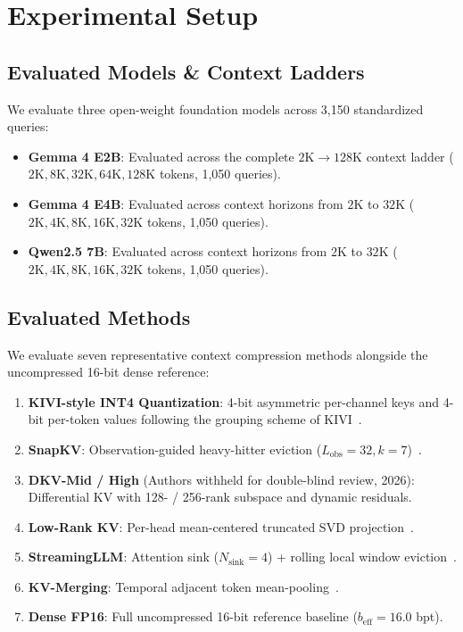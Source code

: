 \documentclass[10pt]{article}
\theoremstyle{definition}
\begin{document}
\section{Experimental Setup}
\label{sec:setup}

\subsection{Evaluated Models \& Context Ladders}
We evaluate three open-weight foundation models across 3,150 standardized queries:
\begin{itemize}[leftmargin=*,itemsep=1.0pt]
    \item \textbf{Gemma 4 E2B}: Evaluated across the complete $2\text{K} \to 128\text{K}$ context ladder ($2\text{K}, 8\text{K}, 32\text{K}, 64\text{K}, 128\text{K}$ tokens, 1,050 queries).
    \item \textbf{Gemma 4 E4B}: Evaluated across context horizons from $2\text{K}$ to $32\text{K}$ ($2\text{K}, 4\text{K}, 8\text{K}, 16\text{K}, 32\text{K}$ tokens, 1,050 queries).
    \item \textbf{Qwen2.5 7B}: Evaluated across context horizons from $2\text{K}$ to $32\text{K}$ ($2\text{K}, 4\text{K}, 8\text{K}, 16\text{K}, 32\text{K}$ tokens, 1,050 queries).
\end{itemize}

\subsection{Evaluated Methods}
We evaluate seven representative context compression methods alongside the uncompressed 16-bit dense reference:
\begin{enumerate}[leftmargin=*,itemsep=0.5pt,topsep=1.5pt]
    \item \textbf{KIVI-style INT4 Quantization}: 4-bit asymmetric per-channel keys and 4-bit per-token values following the grouping scheme of KIVI~\citep{liu2024kivi}.
    \item \textbf{SnapKV}: Observation-guided heavy-hitter eviction ($L_{\text{obs}} = 32, k = 7$)~\citep{li2024snapkv}.
    \item \textbf{DKV-Mid / High} (Authors withheld for double-blind review, 2026): Differential KV with 128- / 256-rank subspace and dynamic residuals.
    \item \textbf{Low-Rank KV}: Per-head mean-centered truncated SVD projection~\citep{sharma2023truth}.
    \item \textbf{StreamingLLM}: Attention sink ($N_{\text{sink}} = 4$) + rolling local window eviction~\citep{xiao2023streamingllm}.
    \item \textbf{KV-Merging}: Temporal adjacent token mean-pooling~\citep{ge2023model}.
    \item \textbf{Dense FP16}: Full uncompressed 16-bit reference baseline ($b_{\text{eff}} = 16.0$ bpt).
\end{enumerate}
\end{document}
